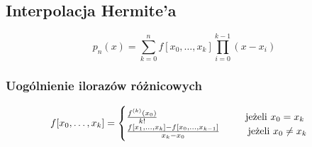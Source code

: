 \documentclass[../mn-notatki.tex]{subfiles}
\begin{document}
\pagebreak
\subsection{Interpolacja Hermite'a}

\begin{tcolorbox}
\[
p_n(x) = \sum_{k=0}^{n} f[x_0,\ldots,x_k] \prod_{i=0}^{k-1} (x-x_i)
\]
\end{tcolorbox}

\subsubsection{Uogólnienie ilorazów różnicowych}

\begin{tcolorbox}
\[
f[x_0,\ldots,x_k] = \begin{cases}
\frac{f^{(k)}(x_0)}{k!} \tab\tab\tab \text{~jeżeli } x_0 = x_k\\
\frac{f[x_1,\ldots,x_k] - f[x_0,\ldots,x_{k-1}]}{x_k - x_0}
\tab \text{jeżeli } x_0 \neq x_k
\end{cases}
\]
\end{tcolorbox}

\end{document}
